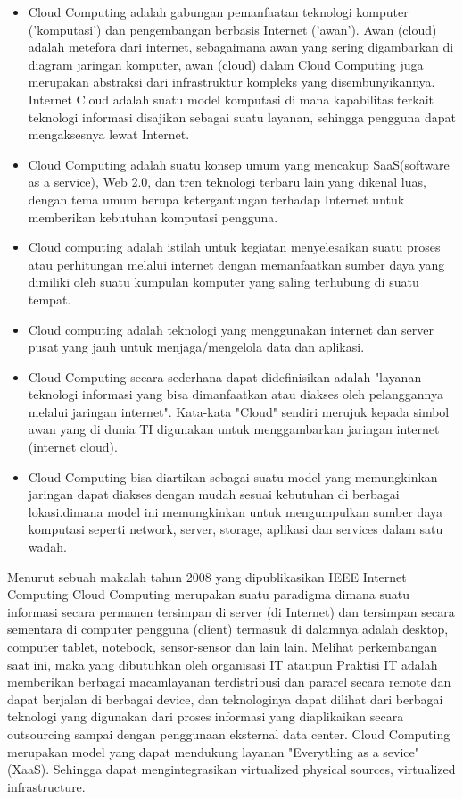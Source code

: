 \begin{itemize}
\item Cloud Computing adalah gabungan pemanfaatan teknologi komputer ('komputasi') dan pengembangan berbasis Internet ('awan'). Awan (cloud) adalah metefora dari internet, sebagaimana awan yang sering digambarkan di diagram jaringan komputer, awan (cloud) dalam Cloud Computing juga merupakan abstraksi dari infrastruktur kompleks yang disembunyikannya. Internet Cloud adalah suatu model komputasi di mana kapabilitas terkait teknologi informasi disajikan sebagai suatu layanan, sehingga pengguna dapat mengaksesnya lewat Internet.
\item Cloud Computing adalah suatu konsep umum yang mencakup SaaS(software as a service), Web 2.0, dan tren teknologi terbaru lain yang dikenal luas, dengan tema umum berupa ketergantungan terhadap Internet untuk memberikan kebutuhan komputasi pengguna.
\item Cloud computing adalah istilah untuk kegiatan menyelesaikan suatu proses atau perhitungan melalui internet dengan memanfaatkan sumber daya yang dimiliki oleh suatu kumpulan komputer yang saling terhubung di suatu tempat.
\item Cloud computing adalah teknologi yang menggunakan internet dan server pusat yang jauh untuk menjaga/mengelola data dan aplikasi.
\item Cloud Computing secara sederhana dapat didefinisikan adalah "layanan teknologi informasi yang bisa dimanfaatkan atau diakses oleh pelanggannya melalui jaringan internet". Kata-kata "Cloud" sendiri merujuk kepada simbol awan yang di dunia TI digunakan untuk menggambarkan jaringan internet (internet cloud).
\item Cloud Computing bisa diartikan sebagai suatu model yang memungkinkan jaringan dapat diakses dengan mudah sesuai kebutuhan di berbagai lokasi.dimana model ini memungkinkan untuk mengumpulkan sumber daya komputasi seperti network, server, storage, aplikasi dan services dalam satu wadah.
\end{itemize}
\tab Menurut sebuah makalah tahun 2008 yang dipublikasikan IEEE Internet Computing Cloud Computing merupakan suatu paradigma dimana suatu informasi secara permanen tersimpan di server (di Internet) dan tersimpan secara sementara di computer pengguna (client) termasuk di dalamnya adalah desktop, computer tablet, notebook, sensor-sensor dan lain lain. Melihat perkembangan saat ini, maka yang dibutuhkan oleh organisasi IT ataupun Praktisi IT adalah memberikan berbagai macamlayanan terdistribusi dan pararel secara remote dan dapat berjalan di berbagai device, dan teknologinya dapat dilihat dari berbagai teknologi yang digunakan dari proses informasi yang diaplikaikan secara outsourcing sampai dengan penggunaan eksternal data center. Cloud Computing merupakan model yang dapat mendukung layanan "Everything as a sevice" (XaaS). Sehingga dapat mengintegrasikan virtualized physical sources, virtualized infrastructure.
